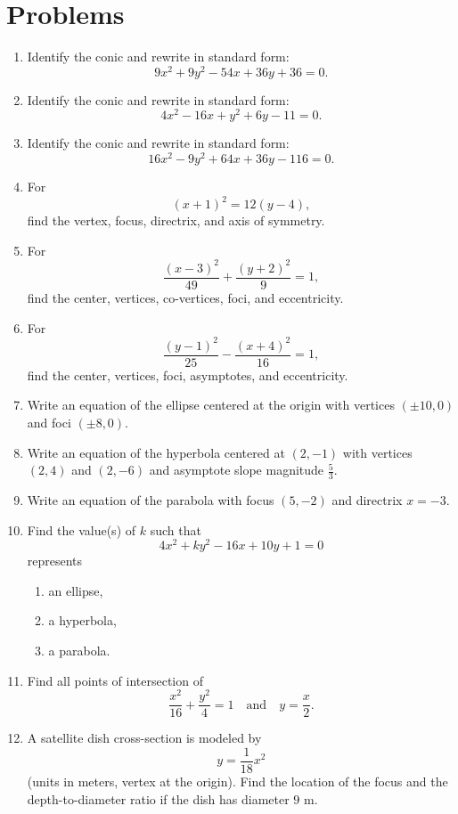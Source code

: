 \documentclass[12pt]{article}
\begin{document}
\section*{Problems}
\begin{enumerate}
  \item Identify the conic and rewrite in standard form:
  \[
  9x^2+9y^2-54x+36y+36=0.
  \]

  \item Identify the conic and rewrite in standard form:
  \[
  4x^2-16x+y^2+6y-11=0.
  \]

  \item Identify the conic and rewrite in standard form:
  \[
  16x^2-9y^2+64x+36y-116=0.
  \]

  \item For
  \[
  (x+1)^2=12(y-4),
  \]
  find the vertex, focus, directrix, and axis of symmetry.

  \item For
  \[
  \frac{(x-3)^2}{49}+\frac{(y+2)^2}{9}=1,
  \]
  find the center, vertices, co-vertices, foci, and eccentricity.

  \item For
  \[
  \frac{(y-1)^2}{25}-\frac{(x+4)^2}{16}=1,
  \]
  find the center, vertices, foci, asymptotes, and eccentricity.

  \item Write an equation of the ellipse centered at the origin with vertices $(\pm 10,0)$ and foci $(\pm 8,0)$.

  \item Write an equation of the hyperbola centered at $(2,-1)$ with vertices $(2,4)$ and $(2,-6)$ and asymptote slope magnitude $\frac{5}{3}$.

  \item Write an equation of the parabola with focus $(5,-2)$ and directrix $x=-3$.

  \item Find the value(s) of $k$ such that
  \[
  4x^2+ky^2-16x+10y+1=0
  \]
  represents
  \begin{enumerate}
    \item an ellipse,
    \item a hyperbola,
    \item a parabola.
  \end{enumerate}

  \item Find all points of intersection of
  \[
  \frac{x^2}{16}+\frac{y^2}{4}=1
  \quad \text{and} \quad
  y=\frac{x}{2}.
  \]

  \item A satellite dish cross-section is modeled by
  \[
  y=\frac{1}{18}x^2
  \]
  (units in meters, vertex at the origin). Find the location of the focus and the depth-to-diameter ratio if the dish has diameter $9$ m.
\end{enumerate}
\end{document}
